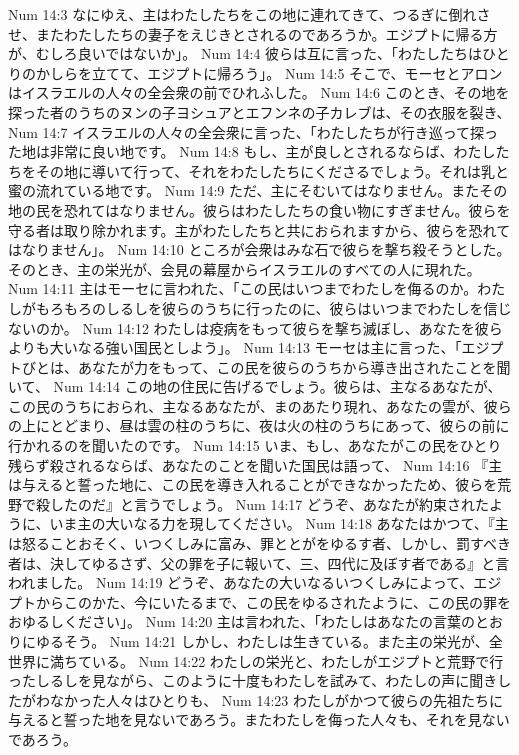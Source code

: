 Num 14:3  なにゆえ、主はわたしたちをこの地に連れてきて、つるぎに倒れさせ、またわたしたちの妻子をえじきとされるのであろうか。エジプトに帰る方が、むしろ良いではないか」。
Num 14:4  彼らは互に言った、「わたしたちはひとりのかしらを立てて、エジプトに帰ろう」。
Num 14:5  そこで、モーセとアロンはイスラエルの人々の全会衆の前でひれふした。
Num 14:6  このとき、その地を探った者のうちのヌンの子ヨシュアとエフンネの子カレブは、その衣服を裂き、
Num 14:7  イスラエルの人々の全会衆に言った、「わたしたちが行き巡って探った地は非常に良い地です。
Num 14:8  もし、主が良しとされるならば、わたしたちをその地に導いて行って、それをわたしたちにくださるでしょう。それは乳と蜜の流れている地です。
Num 14:9  ただ、主にそむいてはなりません。またその地の民を恐れてはなりません。彼らはわたしたちの食い物にすぎません。彼らを守る者は取り除かれます。主がわたしたちと共におられますから、彼らを恐れてはなりません」。
Num 14:10  ところが会衆はみな石で彼らを撃ち殺そうとした。そのとき、主の栄光が、会見の幕屋からイスラエルのすべての人に現れた。
Num 14:11  主はモーセに言われた、「この民はいつまでわたしを侮るのか。わたしがもろもろのしるしを彼らのうちに行ったのに、彼らはいつまでわたしを信じないのか。
Num 14:12  わたしは疫病をもって彼らを撃ち滅ぼし、あなたを彼らよりも大いなる強い国民としよう」。
Num 14:13  モーセは主に言った、「エジプトびとは、あなたが力をもって、この民を彼らのうちから導き出されたことを聞いて、
Num 14:14  この地の住民に告げるでしょう。彼らは、主なるあなたが、この民のうちにおられ、主なるあなたが、まのあたり現れ、あなたの雲が、彼らの上にとどまり、昼は雲の柱のうちに、夜は火の柱のうちにあって、彼らの前に行かれるのを聞いたのです。
Num 14:15  いま、もし、あなたがこの民をひとり残らず殺されるならば、あなたのことを聞いた国民は語って、
Num 14:16  『主は与えると誓った地に、この民を導き入れることができなかったため、彼らを荒野で殺したのだ』と言うでしょう。
Num 14:17  どうぞ、あなたが約束されたように、いま主の大いなる力を現してください。
Num 14:18  あなたはかつて、『主は怒ることおそく、いつくしみに富み、罪ととがをゆるす者、しかし、罰すべき者は、決してゆるさず、父の罪を子に報いて、三、四代に及ぼす者である』と言われました。
Num 14:19  どうぞ、あなたの大いなるいつくしみによって、エジプトからこのかた、今にいたるまで、この民をゆるされたように、この民の罪をおゆるしください」。
Num 14:20  主は言われた、「わたしはあなたの言葉のとおりにゆるそう。
Num 14:21  しかし、わたしは生きている。また主の栄光が、全世界に満ちている。
Num 14:22  わたしの栄光と、わたしがエジプトと荒野で行ったしるしを見ながら、このように十度もわたしを試みて、わたしの声に聞きしたがわなかった人々はひとりも、
Num 14:23  わたしがかつて彼らの先祖たちに与えると誓った地を見ないであろう。またわたしを侮った人々も、それを見ないであろう。
